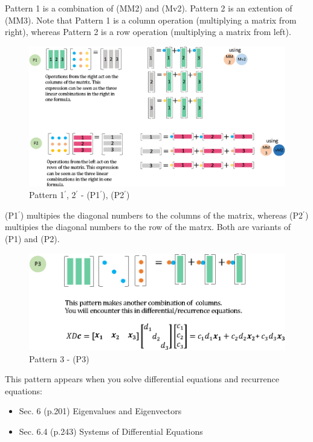 \documentclass[letterpaper]{article}
\begin{document}
Pattern 1 is a combination of (MM2) and (Mv2).
Pattern 2 is an extention of (MM3). Note that Pattern 1 is a column operation (multiplying a matrix from right),
whereas Pattern 2 is a row operation (multiplying a matrix from left).

\begin{figure}[H]
  \includegraphics[keepaspectratio, width=\linewidth]{Pattern11-22.eps}
  \caption{Pattern 1$^\prime$, 2$^\prime$ - (P1$^\prime$), (P2$^\prime$)}
\end{figure}

(P1$^\prime$) multipies the diagonal numbers to the columns of the matrix,
whereas (P2$^\prime$) multipies the diagonal numbers to the row of the matrx.
Both are variants of (P1) and (P2).

\begin{figure}[H]
  \includegraphics[keepaspectratio, width=\linewidth]{Pattern3.eps}
  \caption{Pattern 3 - (P3)}
\end{figure}

This pattern appears when you solve differential equations and recurrence equations:

\begin{itemize}
  \item Sec. 6 (p.201) Eigenvalues and Eigenvectors
  \item Sec. 6.4 (p.243) Systems of Differential Equations
\end{itemize} 
\end{document}
